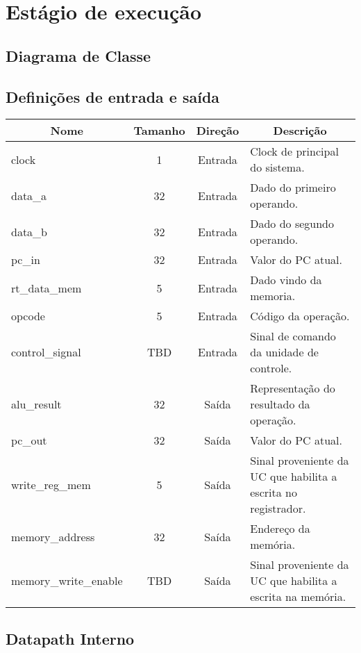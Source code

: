 \section{Estágio de execução}
	\subsection{Diagrama de Classe}
  \begin{figure}[h]
    
  \end{figure}
		
		\subsection{Definições de entrada e saída}
		
	\begin{center}
		\begin{longtable}[pos]{| l | c | c | m{7cm} |} \hline
			\multicolumn{1}{|c|}{\cellcolor[gray]{0.9}\textbf{Nome}} & 
			\multicolumn{1}{c|}{\cellcolor[gray]{0.9}\textbf{Tamanho}} & 
			\multicolumn{1}{c|}{\cellcolor[gray]{0.9}\textbf{Direção}} &
			\multicolumn{1}{c|}{\cellcolor[gray]{0.9}\textbf{Descrição}} \\ \hline
			\endhead
			\hline
			\endlastfoot
			
			clock & 1 & Entrada & Clock de principal do sistema.\\ \hline
			data\_a & 32 & Entrada & Dado do primeiro operando. \\ \hline
			data\_b & 32 & Entrada & Dado do segundo operando. \\ \hline
			pc\_in & 32 & Entrada & Valor do PC atual. \\ \hline
			rt\_data\_mem & 5 & Entrada & Dado vindo da memoria. \\ \hline
			opcode & 5 & Entrada & Código da operação.\\ \hline
			control\_signal & TBD & Entrada & Sinal de comando da unidade de controle. \\ \hline
			alu\_result & 32 & Saída & Representação do resultado da operação. \\ \hline
			pc\_out & 32 & Saída & Valor do PC atual. \\ \hline
			write\_reg\_mem & 5 & Saída & Sinal proveniente da UC que habilita a escrita no registrador. \\ \hline
			memory\_address & 32 & Saída & Endereço da memória. \\ \hline
			memory\_write\_enable & TBD & Saída & Sinal proveniente da UC que habilita a escrita na memória.
			
		\end{longtable}
	\end{center}
	
	\subsection{Datapath Interno}
	
